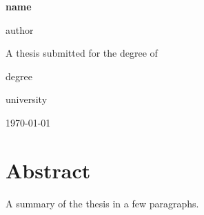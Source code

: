 \documentclass[12pt,a4paper,oneside]{report}
\title{\doctitle}
\author{\docauthor}
\date{\today}
\newcommand{\doctitle}{%
  {{name}}%
}
\newcommand{\docauthor}{%
  {{author}}%
}
\newcommand{\docdegree}{%
  {{degree}}%
}
\newcommand{\docuniversity}{%
  {{university}}%
}
\begin{document}
\begin{titlepage}
  \centering
  \vspace*{3cm}
  {\Huge\bfseries \doctitle\par}
  \vspace{2cm}
  {\Large \docauthor\par}
  \vfill
  A thesis submitted for the degree of\par
  \docdegree\par
  \vspace{1cm}
  \docuniversity\par
  \vspace{1cm}
  \today
\end{titlepage}


\chapter*{Abstract}
A summary of the thesis in a few paragraphs.

\tableofcontents
\listoffigures
\listoftables

\clearpage
{}
\onehalfspacing





\appendix




\end{document}

